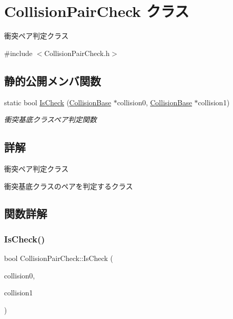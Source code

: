 \hypertarget{class_collision_pair_check}{}\section{Collision\+Pair\+Check クラス}
\label{class_collision_pair_check}


衝突ペア判定クラス  




{\ttfamily \#include $<$Collision\+Pair\+Check.\+h$>$}

\subsection*{静的公開メンバ関数}
\begin{DoxyCompactItemize}
\item 
static bool \mbox{\hyperlink{class_collision_pair_check_aa7603c32ae782ad890280d360ae19dfe}{Is\+Check}} (\mbox{\hyperlink{class_collision_base}{Collision\+Base}} $\ast$collision0, \mbox{\hyperlink{class_collision_base}{Collision\+Base}} $\ast$collision1)
\begin{DoxyCompactList}\small\item\em 衝突基底クラスペア判定関数 \end{DoxyCompactList}\end{DoxyCompactItemize}


\subsection{詳解}
衝突ペア判定クラス 

衝突基底クラスのペアを判定するクラス 

\subsection{関数詳解}
\mbox{\label{class_collision_pair_check_aa7603c32ae782ad890280d360ae19dfe}} 
\subsubsection{\texorpdfstring{Is\+Check()}{IsCheck()}}
{\footnotesize\ttfamily bool Collision\+Pair\+Check\+::\+Is\+Check (\begin{DoxyParamCaption}\item[{\mbox{\hyperlink{class_collision_base}{Collision\+Base}} $\ast$}]{collision0,  }\item[{\mbox{\hyperlink{class_collision_base}{Collision\+Base}} $\ast$}]{collision1 }\end{DoxyParamCaption})\hspace{0.3cm}{\ttfamily [static]}}



